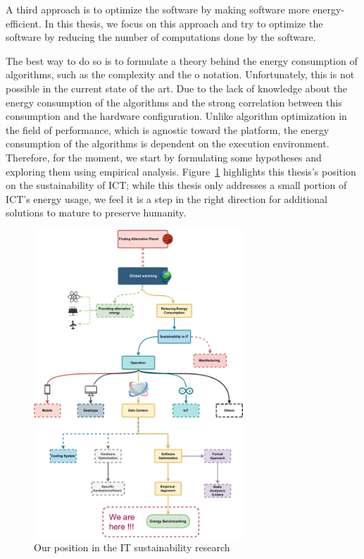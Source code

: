 A third approach is to optimize the software by making software more energy-efficient.
In this thesis, we focus on this approach and try to optimize the software by reducing the number of computations done by the software.

The best way to do so is to formulate a theory behind the energy consumption of algorithms, such as the complexity and the o notation.
Unfortunately, this is not possible in the current state of the art.
Due to the lack of knowledge about the energy consumption of the algorithms and the strong correlation between this consumption and the hardware configuration.
Unlike algorithm optimization in the field of performance, which is agnostic toward the platform, the energy consumption of the algorithms is dependent on the execution environment.
Therefore, for the moment, we start by formulating some hypotheses and exploring them using empirical analysis.
Figure~\ref{fig:thesis_position} highlights this thesis's position on the sustainability of ICT\@; while this thesis only addresses a small portion of ICT's energy usage, we feel it is a step in the right direction for additional solutions to mature to preserve humanity.

\begin{figure}[!h]
      \centering
      \includegraphics[width=0.7\textwidth,height=\textheight,keepaspectratio]{chapters/thesis_position.pdf}
      \caption{Our position in the IT sustainability research}
      \label{fig:thesis_position}
\end{figure}
